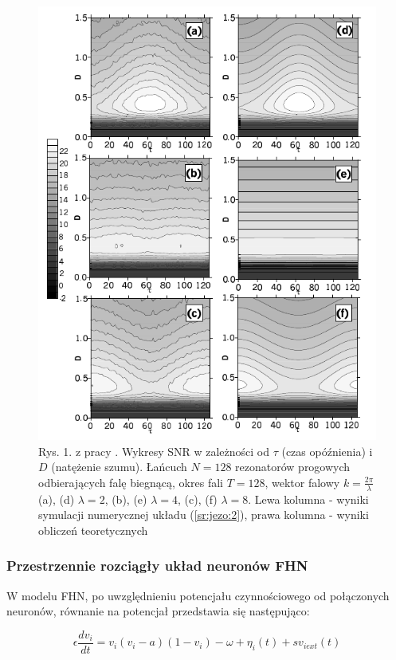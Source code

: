   \begin{figure}
    \includegraphics[width=120mm]{images/krawiecki_jezo_1.png}
    \caption{Rys. 1. z pracy \cite{ijmpb_23_2}. Wykresy SNR w zależności od $\tau$ (czas opóźnienia) i $D$ (natężenie szumu). Łańcuch $N=128$ rezonatorów progowych odbierających falę biegnącą, okres fali $T = 128$, wektor falowy $k=\frac{2\pi}{\lambda}$ (a), (d) $\lambda = 2$, (b), (e) $\lambda = 4$, (c), (f) $\lambda = 8$. Lewa kolumna - wyniki symulacji numerycznej układu (\ref{sr:jezo:2}), prawa kolumna - wyniki obliczeń teoretycznych}
    \label{fig:graphics:krawiecki_jezo}
  \end{figure}

  \subsubsection{Przestrzennie rozciągły układ neuronów FHN}
  \label{sec:przestrzennie_rozciagly_fhn}

  W modelu FHN, po uwzględnieniu potencjału czynnościowego od połączonych neuronów, równanie na potencjał przedstawia się następująco:

  \begin{equation} \label{eq:v2}
    \epsilon \frac{dv_i}{dt} = v_i(v_i-a)(1-v_i)- \omega  + \eta_i(t) + sv_{iext}(t)
  \end{equation}


